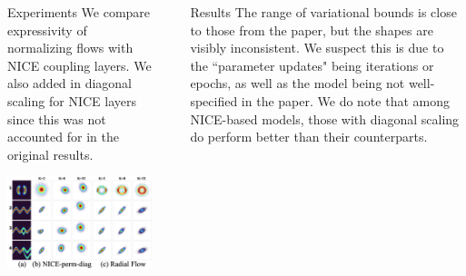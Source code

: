 \documentclass[final,hyperref={pdfpagelabels=false}]{beamer}
\newcommand{\shrink}{-15pt}
\begin{document}
\begin{frame}[t]
\begin{columns}[t]
\begin{column}{.3\textwidth}
    
          
      \begin{block}{Experiments}
     	We compare expressivity of normalizing flows with NICE coupling layers. We also added in diagonal scaling for NICE layers since this was not accounted for in the original results.
      \end{block}
      
      \begin{center}
	\includegraphics[width=0.9\columnwidth]{EFs-ours}
      \end{center}
      
      
    

  \end{column} %
  


  \begin{column}{.02\textwidth}\end{column} %

  \begin{column}{.3\textwidth} %

    \vspace{\shrink} 
   \begin{block}{Results}
      The range of variational bounds is close to those from the paper, but the shapes are visibly inconsistent. We suspect this is due to the ``parameter updates" being iterations or epochs, as well as the model being not well-specified in the paper. We do note that among NICE-based models, those with diagonal scaling do perform better than their counterparts.
      \end{block}
    

\end{column}
\end{columns}
\end{frame}
\end{document}
